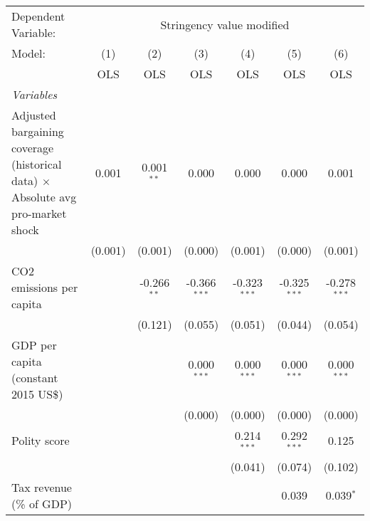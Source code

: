 
\begingroup
\centering
\begin{tabular}{lcccccc}
   \toprule
   Dependent Variable: & \multicolumn{6}{c}{Stringency value modified}\\
   Model:                                                                                 & (1)     & (2)           & (3)            & (4)            & (5)            & (6)\\  
                                                                                          &  OLS    & OLS           & OLS            & OLS            & OLS            & OLS\\  
   \midrule
   \emph{Variables}\\
   Adjusted bargaining coverage (historical data) $\times$ Absolute avg pro-market shock  & 0.001   & 0.001$^{**}$  & 0.000          & 0.000          & 0.000          & 0.001\\   
                                                                                          & (0.001) & (0.001)       & (0.000)        & (0.001)        & (0.000)        & (0.001)\\   
   CO2 emissions per capita                                                               &         & -0.266$^{**}$ & -0.366$^{***}$ & -0.323$^{***}$ & -0.325$^{***}$ & -0.278$^{***}$\\   
                                                                                          &         & (0.121)       & (0.055)        & (0.051)        & (0.044)        & (0.054)\\   
   GDP per capita (constant 2015 US\$)                                                    &         &               & 0.000$^{***}$  & 0.000$^{***}$  & 0.000$^{***}$  & 0.000$^{***}$\\   
                                                                                          &         &               & (0.000)        & (0.000)        & (0.000)        & (0.000)\\   
   Polity score                                                                           &         &               &                & 0.214$^{***}$  & 0.292$^{***}$  & 0.125\\   
                                                                                          &         &               &                & (0.041)        & (0.074)        & (0.102)\\   
   Tax revenue (\% of GDP)                                                                &         &               &                &                & 0.039          & 0.039$^{*}$\\   

\end{tabular}
